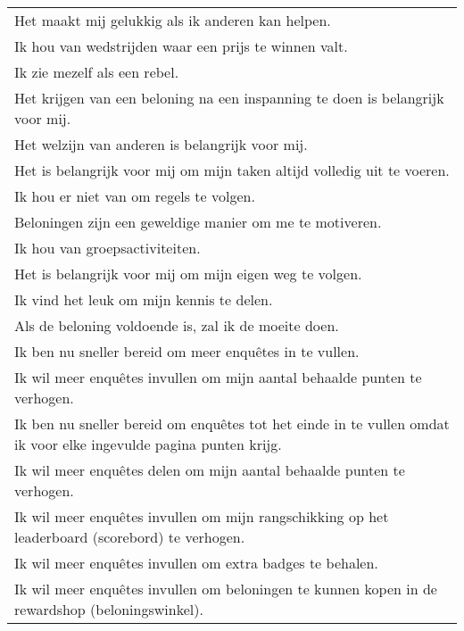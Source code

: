 \begin{table}
\begin{tabular}{|p{1.0\linewidth}|}
        Het maakt mij gelukkig als ik anderen kan helpen.                                                                   \\
        Ik hou van wedstrijden waar een prijs te winnen valt.                                                               \\
        Ik zie mezelf als een rebel.                                                                                        \\
        Het krijgen van een beloning na een inspanning te doen is belangrijk voor mij.                                      \\
        Het welzijn van anderen is  belangrijk voor mij.                                                                    \\
        Het is belangrijk voor mij om mijn taken altijd volledig uit te voeren.                                             \\
        Ik hou er niet van om regels te volgen.                                                                             \\
        Beloningen zijn een geweldige manier om me te motiveren.                                                            \\
        Ik hou van groepsactiviteiten.                                                                                      \\
        Het is belangrijk voor mij om mijn eigen weg te volgen.                                                             \\
        Ik vind het leuk om mijn kennis te delen.                                                                           \\
        Als de beloning voldoende is, zal ik de moeite doen.                                                                \\
        Ik ben nu sneller bereid om meer enquêtes in te vullen.                                                             \\
        Ik wil meer enquêtes invullen om mijn aantal behaalde punten te verhogen.                                           \\
        Ik ben nu sneller bereid om enquêtes tot het einde in te vullen omdat ik voor elke ingevulde pagina   punten krijg. \\
        Ik wil meer enquêtes delen om mijn aantal behaalde punten te verhogen.                                              \\
        Ik wil meer enquêtes invullen om mijn rangschikking op het leaderboard (scorebord) te verhogen.                     \\
        Ik wil meer enquêtes invullen om extra badges te behalen.                                                           \\
        Ik wil meer enquêtes invullen om beloningen te kunnen kopen in de rewardshop (beloningswinkel). \\
         \hline                    
    \end{tabular}
\end{table}